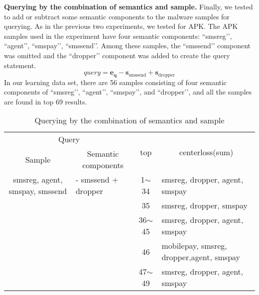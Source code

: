 \textbf{Querying by the combination of semantics and sample. }
Finally, we tested to add or subtract some semantic components to the malware samples for querying. As in the previous two experiments, we tested for APK. The APK samples used in the experiment have four semantic components: ``smsreg’’, ``agent’’, ``smspay’’, ``smssend’’. Among these samples, the ``smssend’’ component was omitted and the ``dropper’’ component was added to create the query statement.
\[
   query = \mathbf{e_q} - \mathbf{s}_{\text{smssend}} + \mathbf{s}_{\text{dropper}} 
\]
In our learning data set, there are 56 samples consisting of four semantic components of ``smsreg’’, ``agent’’, ``smspay’’, and ``dropper’’, and all the samples are found in top 69 results.


\begin{table*}%
\caption{Querying by the combination of semantics and sample}
\label{tab:sample_and_semantics_query_result}
\begin{minipage}{\textwidth}
\begin{center}
\begin{tabular}{llcl}
\hline
\multicolumn{2}{c}{Query}                                                                    & \multirow{2}{*}{top} & \multicolumn{1}{c}{\multirow{2}{*}{centerloss(sum)}} \\
\multicolumn{1}{c}{Sample}                         & \multicolumn{1}{c}{Semantic components} &                      & \multicolumn{1}{c}{}                                 \\ \hline
\multicolumn{1}{c}{smsreg, agent, smspay, smssend} & - smssend + dropper                     & 1$\sim$34            & smsreg, dropper, agent, smspay                       \\
                                                   &                                         & 35                   & smsreg, dropper, smspay                              \\
                                                   &                                         & 36$\sim$45           & smsreg, dropper, agent, smspay                       \\
                                                   &                                         & 46                   & mobilepay, smsreg, dropper,agent, smspay             \\
                                                   &                                         & 47$\sim$49           & smsreg, dropper, agent, smspay                       \\

\end{tabular}
\end{center}
\end{minipage}
\end{table*}
